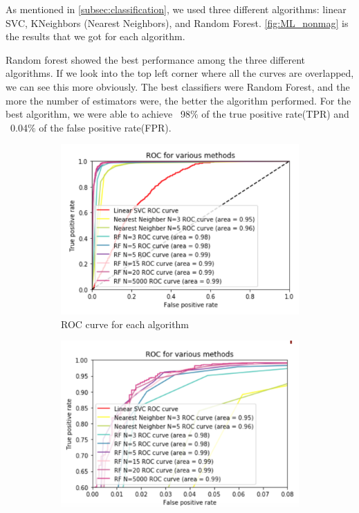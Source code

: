 \documentclass[\docopts]{\docclass}
\begin{document}
As mentioned in \autoref{subsec:classification}, we used three different algorithms: linear SVC, KNeighbors (Nearest Neighbors), and
Random Forest. \autoref{fig:ML_nonmag} is the results that we got for
each algorithm.

Random forest showed the best performance among the three different
algorithms. If we look into the top left corner where all the curves are
overlapped, we can see this more obviously. The best classifiers were
Random Forest, and the more the number of estimators were, the better
the algorithm performed. For the best algorithm, we were able to achieve
~98$\%$ of the true positive rate(TPR) and ~0.04$\%$ of the false
positive rate(FPR).

\begin{figure}
    \centering
    \begin{subfigure}[bt]{0.48\linewidth}        %
        \centering
        \includegraphics[width=\linewidth]{ML_notmagnified.png}
    \caption{ROC curve for each algorithm}
     \label{fig:ML_nonmag}
    \end{subfigure}
    \begin{subfigure}[bt]{0.48\linewidth}        %
        \centering
        \includegraphics[width=\linewidth]{ML_magnified.png}

\end{subfigure}
\end{figure}
\end{document}

